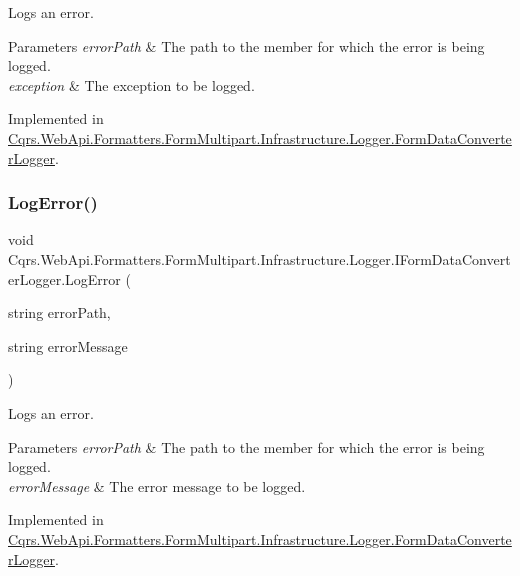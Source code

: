Logs an error. 


\begin{DoxyParams}{Parameters}
{\em error\+Path} & The path to the member for which the error is being logged.\\
\hline
{\em exception} & The exception to be logged.\\
\hline
\end{DoxyParams}


Implemented in \hyperlink{classCqrs_1_1WebApi_1_1Formatters_1_1FormMultipart_1_1Infrastructure_1_1Logger_1_1FormDataConverterLogger_ab54b4f24cc7ee7eacddbb9900a832ca3_ab54b4f24cc7ee7eacddbb9900a832ca3}{Cqrs.\+Web\+Api.\+Formatters.\+Form\+Multipart.\+Infrastructure.\+Logger.\+Form\+Data\+Converter\+Logger}.

\mbox{\label{interfaceCqrs_1_1WebApi_1_1Formatters_1_1FormMultipart_1_1Infrastructure_1_1Logger_1_1IFormDataConverterLogger_a0067054a5f882d2687e8fd9f9ae38e9b_a0067054a5f882d2687e8fd9f9ae38e9b}} 
\subsubsection{\texorpdfstring{Log\+Error()}{LogError()}\hspace{0.1cm}{\footnotesize\ttfamily [2/2]}}
{\footnotesize\ttfamily void Cqrs.\+Web\+Api.\+Formatters.\+Form\+Multipart.\+Infrastructure.\+Logger.\+I\+Form\+Data\+Converter\+Logger.\+Log\+Error (\begin{DoxyParamCaption}\item[{string}]{error\+Path,  }\item[{string}]{error\+Message }\end{DoxyParamCaption})}



Logs an error. 


\begin{DoxyParams}{Parameters}
{\em error\+Path} & The path to the member for which the error is being logged.\\
\hline
{\em error\+Message} & The error message to be logged.\\
\hline
\end{DoxyParams}


Implemented in \hyperlink{classCqrs_1_1WebApi_1_1Formatters_1_1FormMultipart_1_1Infrastructure_1_1Logger_1_1FormDataConverterLogger_a72fcac7560a05dfebbff772a4216a5d8_a72fcac7560a05dfebbff772a4216a5d8}{Cqrs.\+Web\+Api.\+Formatters.\+Form\+Multipart.\+Infrastructure.\+Logger.\+Form\+Data\+Converter\+Logger}.

